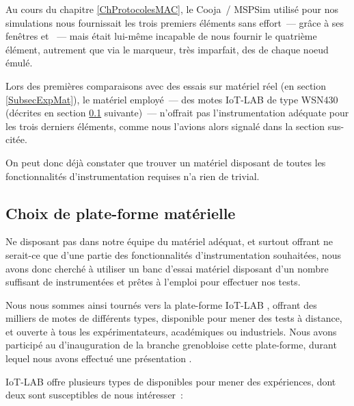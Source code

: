 Au cours du chapitre \ref{ChProtocolesMAC}, le  Cooja~/
MSPSim utilisé pour nos simulations nous fournissait les trois premiers
éléments sans effort~--- grâce à ses fenêtres  et
~--- mais était lui-même incapable de nous
fournir le quatrième élément, autrement que via le marqueur, très
imparfait, des  de chaque noeud émulé.

Lors des premières comparaisons avec des essais sur matériel réel (en
section \vref{SubsecExpMat}), le matériel employé~--- des motes IoT-LAB
de type WSN430 (décrites en section \ref{SubsecChoixHW} suivante)~---
n'offrait pas l'instrumentation adéquate pour les trois derniers
éléments, comme nous l'avions alors signalé dans la section sus-citée.

On peut donc déjà constater que trouver un matériel disposant de toutes
les fonctionnalités d'instrumentation requises n'a rien de trivial.


\subsection{Choix de plate-forme matérielle}
\label{SubsecChoixHW}

Ne disposant pas dans notre équipe du matériel adéquat, et surtout offrant
ne serait-ce que d'une partie des fonctionnalités d'instrumentation
souhaitées, nous avons donc cherché à utiliser un banc d'essai matériel
disposant d'un nombre suffisant de  instrumentées et prêtes
à l'emploi pour effectuer nos tests.

Nous nous sommes ainsi tournés vers la plate-forme IoT-LAB \cite{IotLAB},
offrant des milliers de motes de différents types, disponible pour mener
des tests à distance, et ouverte à tous les expérimentateurs, académiques
ou industriels. Nous avons participé au  d'inauguration de
la branche grenobloise cette plate-forme, durant lequel nous avons effectué
une présentation \cite{KR-IoT-LAB-2014}.

\bigskip

IoT-LAB offre plusieurs types de  disponibles pour mener des
expériences, dont deux sont susceptibles de nous intéresser~:

